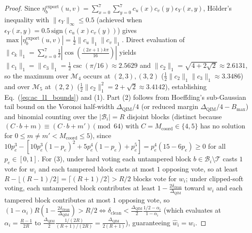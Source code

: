 \documentclass[conference,10pt]{IEEEtran}
\begin{document}
\begin{proof}
Since $\eta^{\text{export}}_b(u,v) = \sum_{x=0}^7 \sum_{y=0}^7 c_u(x) c_v(y) \epsilon_Y(x,y)$, Hölder's inequality with $\|\epsilon_Y\|_\infty \le 0.5$ (achieved when $\epsilon_Y(x,y) = 0.5\,\mathrm{sign}(c_u(x)c_v(y))$) gives $\max |\eta^{\text{export}}_b(u,v)| = \frac{1}{2}\|c_u\|_1 \|c_v\|_1$. Direct evaluation of $\|c_k\|_1 = \sum_{x=0}^7 \frac{1}{2}|\cos(\frac{(2x+1)k\pi}{16})|$ yields $\|c_1\|_1 = \|c_3\|_1 = \frac{1}{2}\csc(\pi/16) \approx 2.5629$ and $\|c_2\|_1 = \sqrt{4+2\sqrt{2}} \approx 2.6131$, so the maximum over $\mathcal{M}_4$ occurs at $(2,3),(3,2)$ ($\frac{1}{2}\|c_2\|_1\|c_3\|_1 \approx 3.3486$) and over $\mathcal{M}_5$ at $(2,2)$ ($\frac{1}{2}\|c_2\|_1^2 = 2+\sqrt{2} \approx 3.4142$), establishing Eq.~(\ref{eq:ac_l1_bounds}) and (1). Part (2) follows from Hoeffding's sub-Gaussian tail bound on the Voronoi half-width $\Delta_{\text{QIM}}/4$ (or reduced margin $\Delta_{\text{QIM}}/4 - B_{\max}$) and binomial counting over the $|\mathcal{B}_i| = R$ disjoint blocks (distinct because $(C\cdot b + m) \equiv (C\cdot b + m') \pmod{64}$ with $C = M_{\text{coord}} \in \{4, 5\}$ has no solution for $0 \le m \ne m' < M_{\text{coord}} \le 5$), since $10p_e^3 - [10p_e^3(1-p_e)^2 + 5p_e^4(1-p_e) + p_e^5] = p_e^4(15 - 6p_e) \ge 0$ for all $p_e \in [0, 1]$. For (3), under hard voting each untampered block $b \in \mathcal{B}_i \setminus \mathcal{T}$ casts $1$ vote for $w_i$ and each tampered block casts at most $1$ opposing vote, so at least $R - \lfloor (R-1)/2 \rfloor = \lceil (R+1)/2 \rceil > R/2$ blocks vote for $w_i$; under clipped-soft voting, each untampered block contributes at least $1 - \frac{2\delta_{\text{clean}}}{\Delta_{\text{QIM}}}$ toward $w_i$ and each tampered block contributes at most $1$ opposing vote, so $(1 - \alpha_i)R(1 - \frac{2\delta_{\text{clean}}}{\Delta_{\text{QIM}}}) > R/2 \iff \delta_{\text{clean}} < \frac{\Delta_{\text{QIM}}}{2}\frac{1/2 - \alpha_i}{1 - \alpha_i}$ (which evaluates at $\alpha_i = \frac{R-1}{2R}$ to $\frac{\Delta_{\text{QIM}}}{2}\frac{1/(2R)}{(R+1)/(2R)} = \frac{\Delta_{\text{QIM}}}{2(R+1)}$), guaranteeing $\hat{w}_i = w_i$.
\end{proof}
\end{document}
